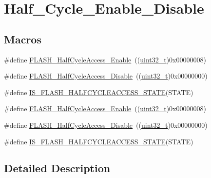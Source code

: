 \hypertarget{group___half___cycle___enable___disable}{}\section{Half\+\_\+\+Cycle\+\_\+\+Enable\+\_\+\+Disable}
\label{group___half___cycle___enable___disable}
\subsection*{Macros}
\begin{DoxyCompactItemize}
\item 
\#define \hyperlink{group___half___cycle___enable___disable_ga95adf58ccf48094a9648085ac8d8af13}{F\+L\+A\+S\+H\+\_\+\+Half\+Cycle\+Access\+\_\+\+Enable}~((\hyperlink{_p_e___types_8h_a33594304e786b158f3fb30289278f5af}{uint32\+\_\+t})0x00000008)
\item 
\#define \hyperlink{group___half___cycle___enable___disable_gad1ec816fa04b9a45e51c1cc9f1ba8f42}{F\+L\+A\+S\+H\+\_\+\+Half\+Cycle\+Access\+\_\+\+Disable}~((\hyperlink{_p_e___types_8h_a33594304e786b158f3fb30289278f5af}{uint32\+\_\+t})0x00000000)
\item 
\#define \hyperlink{group___half___cycle___enable___disable_gad1b9e84a20436dcfe1a1ade4c26dc028}{I\+S\+\_\+\+F\+L\+A\+S\+H\+\_\+\+H\+A\+L\+F\+C\+Y\+C\+L\+E\+A\+C\+C\+E\+S\+S\+\_\+\+S\+T\+A\+TE}(S\+T\+A\+TE)
\item 
\#define \hyperlink{group___half___cycle___enable___disable_ga95adf58ccf48094a9648085ac8d8af13}{F\+L\+A\+S\+H\+\_\+\+Half\+Cycle\+Access\+\_\+\+Enable}~((\hyperlink{_p_e___types_8h_a33594304e786b158f3fb30289278f5af}{uint32\+\_\+t})0x00000008)
\item 
\#define \hyperlink{group___half___cycle___enable___disable_gad1ec816fa04b9a45e51c1cc9f1ba8f42}{F\+L\+A\+S\+H\+\_\+\+Half\+Cycle\+Access\+\_\+\+Disable}~((\hyperlink{_p_e___types_8h_a33594304e786b158f3fb30289278f5af}{uint32\+\_\+t})0x00000000)
\item 
\#define \hyperlink{group___half___cycle___enable___disable_gad1b9e84a20436dcfe1a1ade4c26dc028}{I\+S\+\_\+\+F\+L\+A\+S\+H\+\_\+\+H\+A\+L\+F\+C\+Y\+C\+L\+E\+A\+C\+C\+E\+S\+S\+\_\+\+S\+T\+A\+TE}(S\+T\+A\+TE)
\end{DoxyCompactItemize}


\subsection{Detailed Description}


